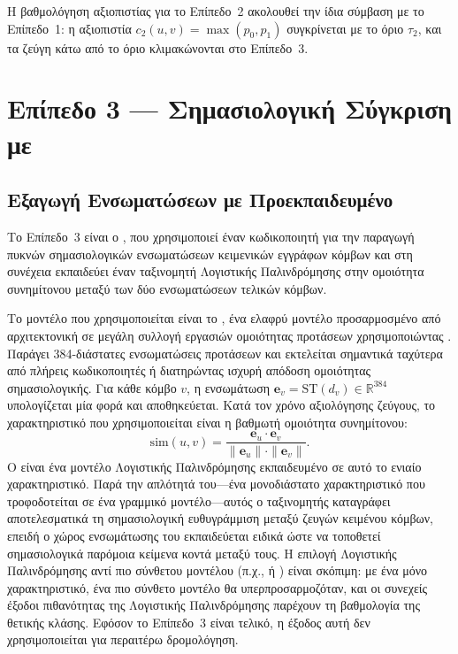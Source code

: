 Η βαθμολόγηση αξιοπιστίας για το Επίπεδο~2 ακολουθεί την ίδια σύμβαση με το
Επίπεδο~1: η αξιοπιστία $c_2(u, v) = \max(p_0, p_1)$ συγκρίνεται με το όριο $\tau_2$,
και τα ζεύγη κάτω από το όριο κλιμακώνονται στο Επίπεδο~3.


\section{Επίπεδο 3 --- Σημασιολογική Σύγκριση με }
\label{sec:tier3}

\subsection{Εξαγωγή Ενσωματώσεων με Προεκπαιδευμένο }
\label{subsec:sentence-transformer}

Το Επίπεδο~3 είναι ο \texttt{}, που χρησιμοποιεί έναν κωδικοποιητή
 για την παραγωγή πυκνών σημασιολογικών ενσωματώσεων
κειμενικών εγγράφων κόμβων και στη συνέχεια εκπαιδεύει έναν ταξινομητή Λογιστικής
Παλινδρόμησης στην ομοιότητα συνημίτονου μεταξύ των δύο ενσωματώσεων τελικών κόμβων.

Το μοντέλο  που χρησιμοποιείται είναι το
\texttt{\en{\EmbeddingModelName{}}}, ένα ελαφρύ μοντέλο προσαρμοσμένο από αρχιτεκτονική
 σε μεγάλη συλλογή εργασιών ομοιότητας προτάσεων χρησιμοποιώντας
.
Παράγει 384-διάστατες ενσωματώσεις προτάσεων και εκτελείται
σημαντικά ταχύτερα από πλήρεις κωδικοποιητές  ή  διατηρώντας
ισχυρή απόδοση ομοιότητας σημασιολογικής.
Για κάθε κόμβο $v$, η ενσωμάτωση
$\mathbf{e}_v = \mathrm{ST}(d_v) \in \mathbb{R}^{384}$ υπολογίζεται μία φορά και
αποθηκεύεται.
Κατά τον χρόνο αξιολόγησης ζεύγους, το χαρακτηριστικό που
χρησιμοποιείται είναι η βαθμωτή ομοιότητα συνημίτονου:
\begin{equation}
    \mathrm{sim}(u, v) = \frac{\mathbf{e}_u \cdot \mathbf{e}_v}
    {\|\mathbf{e}_u\| \cdot \|\mathbf{e}_v\|}.
    \label{eq:cosine-sim}
\end{equation}
Ο  είναι ένα μοντέλο Λογιστικής Παλινδρόμησης εκπαιδευμένο
σε αυτό το ενιαίο χαρακτηριστικό.
Παρά την απλότητά του---ένα μονοδιάστατο
χαρακτηριστικό που τροφοδοτείται σε ένα γραμμικό μοντέλο---αυτός ο ταξινομητής
καταγράφει αποτελεσματικά τη σημασιολογική ευθυγράμμιση μεταξύ ζευγών κειμένου
κόμβων, επειδή ο χώρος ενσωμάτωσης του  εκπαιδεύεται ειδικά
ώστε να τοποθετεί σημασιολογικά παρόμοια κείμενα κοντά μεταξύ τους.
Η επιλογή
Λογιστικής Παλινδρόμησης αντί πιο σύνθετου μοντέλου (π.χ.,  ή ) είναι
σκόπιμη: με ένα μόνο χαρακτηριστικό, ένα πιο σύνθετο μοντέλο θα υπερπροσαρμοζόταν,
και οι συνεχείς έξοδοι πιθανότητας της Λογιστικής Παλινδρόμησης παρέχουν τη
βαθμολογία της θετικής κλάσης.
Εφόσον το Επίπεδο~3 είναι τελικό, η έξοδος αυτή
δεν χρησιμοποιείται για περαιτέρω δρομολόγηση.


